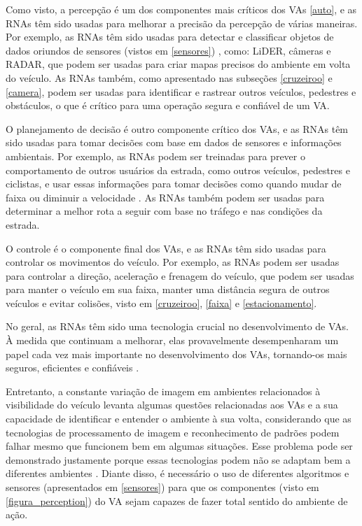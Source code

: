 Como visto, a percepção é um dos componentes mais críticos dos VAs \ref{auto}, e as RNAs têm sido usadas para melhorar a precisão da percepção de várias maneiras. 
Por exemplo, as  RNAs têm sido usadas para detectar e classificar objetos de dados oriundos de sensores (vistos em \ref{sensores}) , como: LiDER, câmeras e RADAR, que podem ser usadas para criar mapas precisos do ambiente em volta do veículo. 
As RNAs também, como apresentado nas subseções \ref{cruzeiroo} e \ref{camera}, podem ser usadas para identificar e rastrear outros veículos, pedestres e obstáculos, o que é crítico para uma operação segura e confiável de um VA.

O planejamento de decisão é outro componente crítico dos VAs, e as  RNAs têm sido usadas para tomar decisões com base em dados de sensores e informações ambientais. Por exemplo, as RNAs podem ser treinadas para prever o comportamento de outros usuários da estrada, como outros veículos, pedestres e ciclistas, e usar essas informações para tomar decisões como quando mudar de faixa ou diminuir a velocidade \cite{aplicacao2}. As RNAs também podem ser usadas para determinar a melhor rota a seguir com base no tráfego e nas condições da estrada. 

O controle é o componente final dos VAs, e as RNAs têm sido usadas para controlar os movimentos do veículo. Por exemplo, as  RNAs podem ser usadas para controlar a direção, aceleração e frenagem do veículo, que podem ser usadas para manter o veículo em sua faixa, manter uma distância segura de outros veículos e evitar colisões, visto em \ref{cruzeiroo}, \ref{faixa} e \ref{estacionamento}.

No geral, as RNAs têm sido uma tecnologia crucial no desenvolvimento de VAs. À medida que continuam a melhorar, elas provavelmente desempenharam um papel cada vez mais importante no desenvolvimento dos VAs, tornando-os mais seguros, eficientes e confiáveis \cite{sensors-yet, aplicacao2}.


Entretanto, a constante variação de imagem em ambientes relacionados à visibilidade do veículo levanta algumas questões relacionadas aos VAs e a sua capacidade de identificar e  entender o ambiente à sua volta, considerando que as tecnologias de processamento de imagem e reconhecimento de padrões podem falhar mesmo que funcionem bem em algumas situações. Esse problema pode ser demonstrado justamente porque essas tecnologias podem não se adaptam bem a diferentes ambientes \cite{caio}. Diante disso, é necessário o uso de diferentes algoritmos e sensores (apresentados em \ref{sensores}) para que os componentes (visto em \ref{figura_perception}) do VA sejam capazes de fazer total sentido do ambiente de ação.

